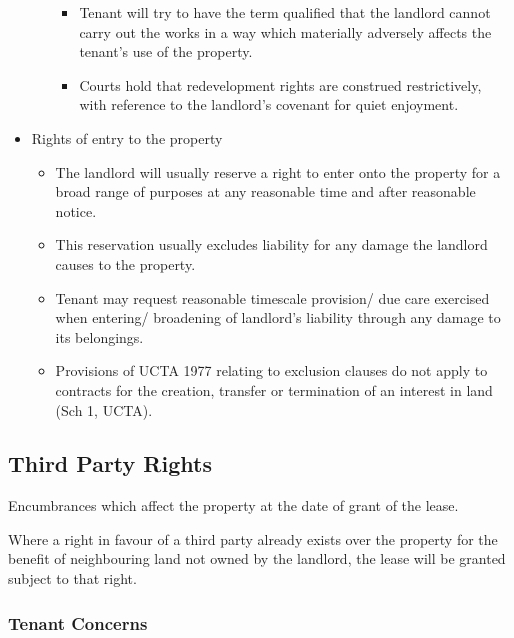 \documentclass[
]{article}
\providecommand{\tightlist}{%
  \setlength{\itemsep}{0pt}\setlength{\parskip}{0pt}}
\begin{document}
\begin{itemize}
\begin{itemize}
    \begin{itemize}
    \tightlist
    \item
      Tenant will try to have the term qualified that the landlord
      cannot carry out the works in a way which materially adversely
      affects the tenant's use of the property.
    \item
      Courts hold that redevelopment rights are construed restrictively,
      with reference to the landlord's covenant for quiet enjoyment.
    \end{itemize}
  \end{itemize}
\item
  Rights of entry to the property

  \begin{itemize}
  \tightlist
  \item
    The landlord will usually reserve a right to enter onto the property
    for a broad range of purposes at any reasonable time and after
    reasonable notice.
  \item
    This reservation usually excludes liability for any damage the
    landlord causes to the property.
  \item
    Tenant may request reasonable timescale provision/ due care
    exercised when entering/ broadening of landlord's liability through
    any damage to its belongings.
  \item
    Provisions of UCTA 1977 relating to exclusion clauses do not apply
    to contracts for the creation, transfer or termination of an
    interest in land (Sch 1, UCTA).
  \end{itemize}
\end{itemize}

\hypertarget{third-party-rights}{%
\subsection{Third Party Rights}\label{third-party-rights}}

Encumbrances which affect the property at the date of grant of the
lease.

Where a right in favour of a third party already exists over the
property for the benefit of neighbouring land not owned by the landlord,
the lease will be granted subject to that right.

\hypertarget{tenant-concerns}{%
\subsubsection{Tenant Concerns}\label{tenant-concerns}}
\end{document}
